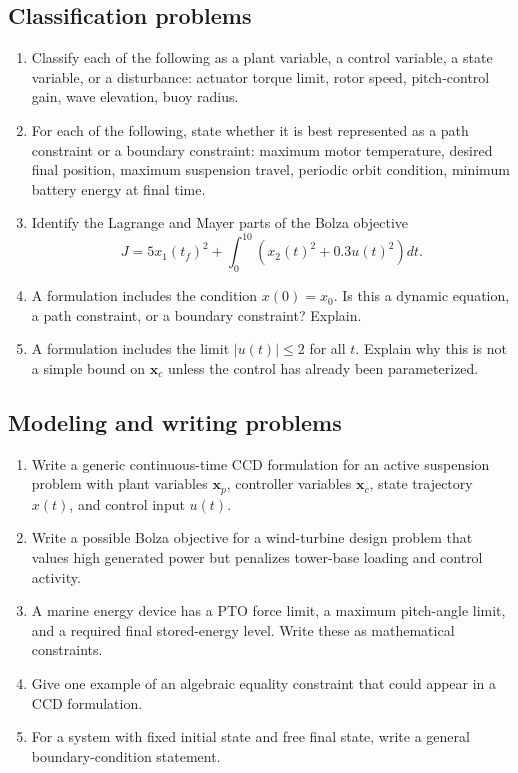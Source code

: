 \documentclass[11pt]{article}
\newcommand{\vect}[1]{\boldsymbol{#1}}
\newcommand{\xp}{\vect{x}_p}
\newcommand{\xc}{\vect{x}_c}
\begin{document}
\subsection*{Classification problems}
\begin{enumerate}[leftmargin=1.5em,label=\textbf{P\arabic*.},resume]
  \item Classify each of the following as a plant variable, a control variable, a state variable, or a disturbance: actuator torque limit, rotor speed, pitch-control gain, wave elevation, buoy radius.
  \item For each of the following, state whether it is best represented as a path constraint or a boundary constraint: maximum motor temperature, desired final position, maximum suspension travel, periodic orbit condition, minimum battery energy at final time.
  \item Identify the Lagrange and Mayer parts of the Bolza objective
  \begin{equation*}
  J = 5x_1(t_f)^2 + \int_{0}^{10}\left(x_2(t)^2 + 0.3u(t)^2\right)dt.
  \end{equation*}
  \item A formulation includes the condition $x(0)=x_0$. Is this a dynamic equation, a path constraint, or a boundary constraint? Explain.
  \item A formulation includes the limit $|u(t)|\le 2$ for all $t$. Explain why this is not a simple bound on $\xc$ unless the control has already been parameterized.
\end{enumerate}

\subsection*{Modeling and writing problems}
\begin{enumerate}[leftmargin=1.5em,label=\textbf{P\arabic*.},resume]
  \item Write a generic continuous-time CCD formulation for an active suspension problem with plant variables $\xp$, controller variables $\xc$, state trajectory $x(t)$, and control input $u(t)$.
  \item Write a possible Bolza objective for a wind-turbine design problem that values high generated power but penalizes tower-base loading and control activity.
  \item A marine energy device has a PTO force limit, a maximum pitch-angle limit, and a required final stored-energy level. Write these as mathematical constraints.
  \item Give one example of an algebraic equality constraint that could appear in a CCD formulation.
  \item For a system with fixed initial state and free final state, write a general boundary-condition statement.
\end{enumerate}
\end{document}
